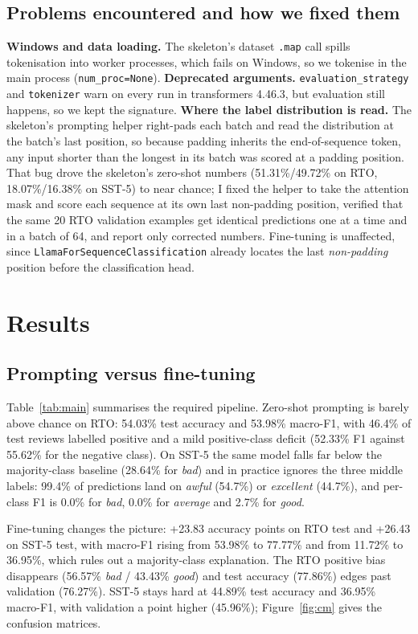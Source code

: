 \documentclass[11pt]{article}
\begin{document}
\subsection{Problems encountered and how we fixed them}
\label{sec:setup-problems}
\textbf{Windows and data loading.} The skeleton's dataset \texttt{.map} call spills tokenisation
into worker processes, which fails on Windows, so we tokenise in the main process
(\texttt{num\_proc=None}). \textbf{Deprecated arguments.} \texttt{evaluation\_strategy} and \texttt{tokenizer} warn on
every run in transformers 4.46.3, but evaluation still happens, so we kept the signature. \textbf{Where the label distribution is
read.} The skeleton's prompting helper right-pads each batch and read the distribution at the
batch's last position, so because padding inherits the end-of-sequence token, any input shorter
than the longest in its batch was scored at a padding position. That bug drove the skeleton's
zero-shot numbers (51.31\%/49.72\% on RTO, 18.07\%/16.38\% on SST-5) to near chance; I fixed the
helper to take the attention mask and score each sequence at its own last non-padding position,
verified that the same 20 RTO validation examples get identical predictions one at a time and in
a batch of 64, and report only corrected numbers. Fine-tuning is unaffected, since
\texttt{LlamaForSequenceClassification} already locates the last \emph{non-padding} position
before the classification head.

\section{Results}

\subsection{Prompting versus fine-tuning}
Table~\ref{tab:main} summarises the required pipeline. Zero-shot prompting is barely above chance on RTO:
54.03\% test accuracy and 53.98\% macro-F1, with 46.4\% of test reviews labelled positive and a
mild positive-class deficit (52.33\% F1 against 55.62\% for the negative class). On SST-5 the
same model falls far below the
majority-class baseline (28.64\% for \emph{bad}) and in practice ignores the three middle
labels: 99.4\% of predictions land on \emph{awful} (54.7\%) or \emph{excellent} (44.7\%), and
per-class F1 is 0.0\% for \emph{bad}, 0.0\% for \emph{average} and 2.7\% for \emph{good}.

Fine-tuning changes the picture: +23.83 accuracy points on RTO test and +26.43 on SST-5 test,
with macro-F1 rising from 53.98\% to 77.77\% and from 11.72\% to 36.95\%, which rules out a
majority-class explanation. The RTO positive bias disappears (56.57\% \emph{bad} / 43.43\%
\emph{good}) and test accuracy (77.86\%) edges past validation (76.27\%). SST-5 stays hard at
44.89\% test accuracy and 36.95\% macro-F1, with validation a point higher (45.96\%);
Figure~\ref{fig:cm} gives the confusion matrices.
\end{document}

